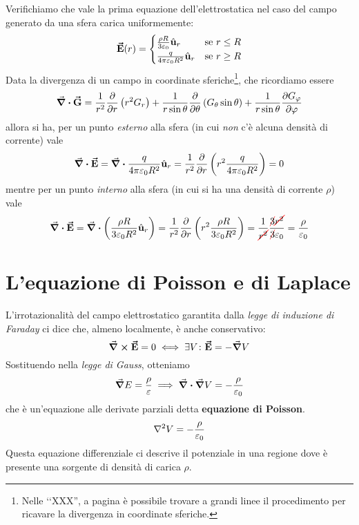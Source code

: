 \begin{examplewt}
	Verifichiamo che vale la prima equazione dell'elettrostatica nel caso del campo generato da una sfera carica uniformemente:
	\begin{equation*}
		\vb*{\va{E}}(r)=\begin{cases}
			\frac{\rho R}{3\varepsilon_0}\hat{\mathbf{u}}_r&\text{se}\ r\leq R\\
			\frac{q}{4\pi\varepsilon_0 R^2}\hat{\mathbf{u}}_r &\text{se}\ r\geq R
		\end{cases}
	\end{equation*}
	Data la divergenza di un campo in coordinate sferiche\footnote{Nelle ‘‘XXX'', a pagina \pageref{DivergenzaSferiche} è possibile trovare a grandi linee il procedimento per ricavare la divergenza in coordinate sferiche.}, che ricordiamo essere
	\begin{equation*}
		\div{\vb*{\va{G}}}=\frac{1}{r^2}\pdv{r}\left(r^2G_r\right)+\frac{1}{r\sin\theta}\pdv{\theta}\left(G_\theta\sin\theta\right)+\frac{1}{r\sin\theta}\pdv{G_\varphi}{\varphi}
	\end{equation*}
	allora si ha, per un punto \textit{esterno} alla sfera (in cui \textit{non} c'è alcuna densità di corrente) vale
	\begin{equation}
		\div{\vb*{\va{E}}}=\div{\frac{q}{4\pi\varepsilon_0 R^2}\hat{\mathbf{u}}_r}=\frac{1}{r^2}\pdv{r}\left(r^2\frac{q}{4\pi\varepsilon_0 R^2}\right)=0
	\end{equation}
	mentre per un punto \textit{interno} alla sfera (in cui si ha una densità di corrente $\rho$) vale
	\begin{equation*}
		\div{\vba{E}}=\div{\left(\frac{\rho R}{3\epsilon_0R^2}\vbh{u}_r\right)}=\frac{1}{r^2}\pdv{r}\left(r^2\frac{\rho R}{3\epsilon_0R^2}\right)=\frac{1}{\Ccancel[red]{r^2}}\frac{\Ccancel[red]{3}\Ccancel[red]{r^2}}{\Ccancel[red]{3}\epsilon_0}=\frac{\rho}{\epsilon_0}
	\end{equation*}
\end{examplewt}
\section{L'equazione di Poisson e di Laplace}\label{EqPoissonSezione}
L'irrotazionalità del campo elettrostatico garantita dalla \textit{legge di induzione di Faraday} ci dice che, almeno localmente, è anche conservativo:
\begin{equation*}
	\curl{\vb*{\va{E}}}=0\iff \exists V\colon \vb*{\va{E}}=-\grad{V}
\end{equation*}
Sostituendo nella \textit{legge di Gauss}, otteniamo
\begin{equation*}
	\grad{E}=\frac{\rho}{\varepsilon}\implies\div{\grad{V}}=-\frac{\rho}{\varepsilon_0}
\end{equation*}
che è un'equazione alle derivate parziali detta \textbf{equazione di Poisson}.
\begin{equation}
	\laplacian{V}=-\frac{\rho}{\epsilon_0}
\end{equation}
Questa equazione differenziale ci descrive il potenziale in una regione dove è presente una sorgente di densità di carica $\rho$.

